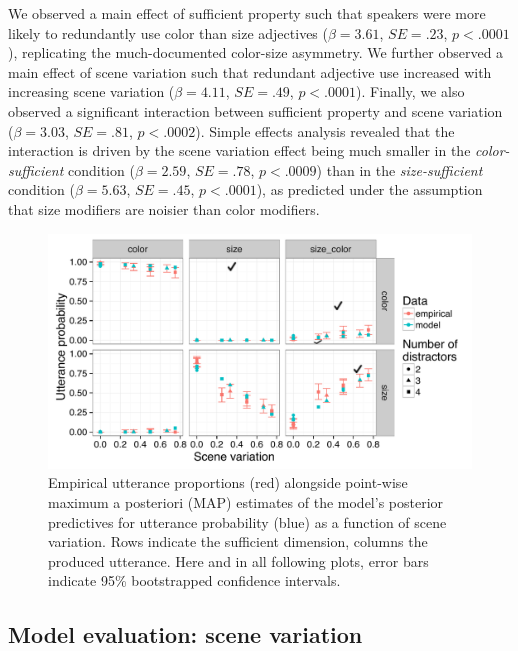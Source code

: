 \documentclass[11pt]{article}
\begin{document}
We observed a main effect of sufficient property such that speakers were more likely to redundantly use color than size adjectives ($\beta = 3.61$, $SE = .23$, $p < .0001$), replicating the much-documented color-size asymmetry. We further observed a main effect of scene variation such that redundant adjective use increased with increasing scene variation ($\beta = 4.11$, $SE = .49$, $p < .0001$). Finally, we also observed a significant interaction between sufficient property and scene variation ($\beta = 3.03$, $SE = .81$, $p < .0002$). Simple effects analysis revealed that the interaction is driven by the scene variation effect being much smaller in the \emph{color-sufficient} condition ($\beta = 2.59$, $SE = .78$, $p < .0009$) than in the \emph{size-sufficient} condition ($\beta = 5.63$, $SE = .45$, $p < .0001$), as predicted under the assumption that size modifiers are noisier than color modifiers.



\begin{figure}
\centering
\includegraphics[width=\textwidth]{../../../models/1a_bda_basic/results_bda/graphs/scenevariation-fixed-reducedconditions-unlogged}
\caption{Empirical utterance proportions  (red)  alongside point-wise maximum a posteriori (MAP) estimates of the model's posterior predictives for utterance probability (blue) as a function of scene variation. Rows indicate the sufficient dimension, columns the produced utterance. Here and in all following plots, error bars indicate 95\% bootstrapped confidence intervals.}
\label{fig:exp1results}
\end{figure}


\subsection{Model evaluation: scene variation}
\label{sec:modifiermodeleval}
\end{document}

